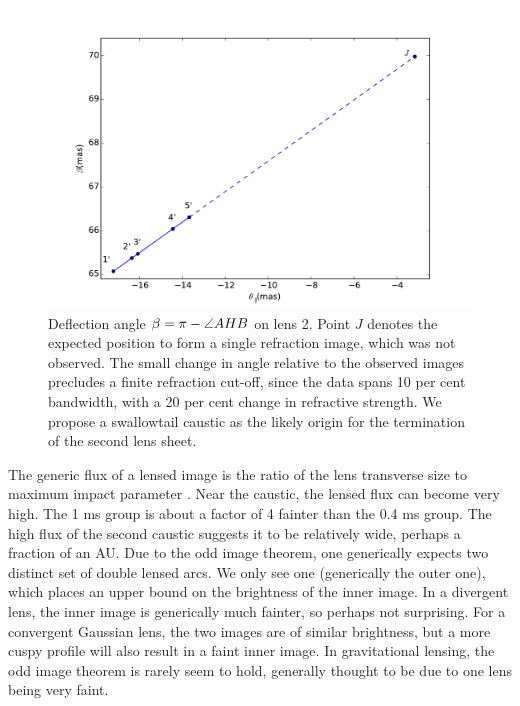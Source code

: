 \documentclass[useAMS,usenatbib]{mn2e}
\begin{document}
\begin{figure}
\centering
\includegraphics[width=1.0\linewidth]{Reflection_angle.pdf}
\caption{Deflection angle $\beta=\pi-\protect\angle AHB$ on lens 2.  Point $J$ denotes the expected position to form a single refraction image, which was not
  observed.   The small change in angle relative to the observed
  images precludes a finite refraction cut-off, since the data spans
  10 per cent bandwidth, with a 20 per cent change in refractive strength.  We
  propose a swallowtail caustic as the likely origin for the
  termination of the second lens sheet.
}
\label{vtrans}
\end{figure}

The generic flux of a lensed image is the ratio of the lens transverse
size to maximum impact parameter \citep{2012MNRAS.421L.132P}.  Near
the caustic, the lensed flux can become very high.  The 1 ms group is
about a factor of 4 fainter than the 0.4 ms group.  The high flux of
the second caustic suggests it to be relatively wide, perhaps a
fraction of an AU.  Due to the odd image theorem, one generically
expects two distinct set of double lensed arcs.  We only see one
(generically the outer one), which places an upper bound on the
brightness of the inner image.  In a divergent
lens\cite{1998ApJ...496..253C}, the inner image is generically much
fainter, so perhaps not surprising. For a convergent Gaussian lens,
the two images are of similar brightness, but a more cuspy profile
will also result in a faint inner image.  In gravitational lensing,
the odd image theorem is rarely seem to hold, generally thought to be
due to one lens being very faint.
\end{document}
